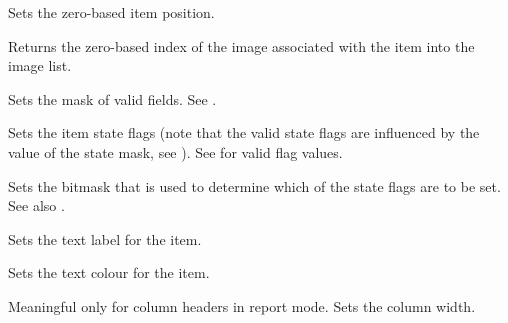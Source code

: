 \label{wxlistitemsetid}


Sets the zero-based item position.



\label{wxlistitemsetimage}


Returns the zero-based index of the image associated with the item
into the image list.



\label{wxlistitemsetmask}


Sets the mask of valid fields. See
.



\label{wxlistitemsetstate}


Sets the item state flags (note that the valid state flags are influenced
by the value of the state mask, see
).
See  for valid flag
values.



\label{wxlistitemsetstatemask}


Sets the bitmask that is used to determine which of the state flags
are to be set. See also .



\label{wxlistitemsettext}


Sets the text label for the item.



\label{wxlistitemsettextcolour}


Sets the text colour for the item.



\label{wxlistitemsetwidth}


Meaningful only for column headers in report mode. Sets the column width.
